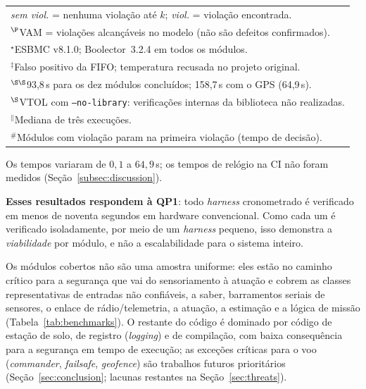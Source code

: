 \documentclass[conference]{IEEEtran}
\begin{document}
\begin{table}[t]
\begin{tabular}{@{}lcrccr@{}}
\bottomrule
\multicolumn{6}{l}{\textit{sem viol.} = nenhuma violação até $k$; \textit{viol.} = violação encontrada.}\\
\multicolumn{6}{l}{$^\P$VAM = violações alcançáveis no modelo (não são defeitos confirmados).}\\
\multicolumn{6}{l}{$^\star$ESBMC v8.1.0; Boolector~3.2.4 em todos os módulos.}\\
\multicolumn{6}{l}{$^\ddagger$Falso positivo da FIFO; temperatura recusada no projeto original.}\\
\multicolumn{6}{l}{$^{\S\S}$93,8\,s para os dez módulos concluídos; 158,7\,s com o GPS (64,9\,s).}\\
\multicolumn{6}{l}{$^\S$VTOL com \texttt{--no-library}: verificações internas da biblioteca não realizadas.}\\
\multicolumn{6}{l}{$^\|$Mediana de três execuções.}\\
\multicolumn{6}{l}{$^{\#}$Módulos com violação param na primeira violação (tempo de decisão).}
\end{tabular}
\end{table}
Os tempos variaram de $0{,}1$ a $64{,}9$\,s; os tempos de relógio na
CI não foram medidos (Seção~\ref{subsec:discussion}).
\begin{rqbox}
\textbf{Esses resultados respondem à QP1}: todo \textit{harness}
cronometrado é verificado em menos de noventa segundos em hardware
convencional. Como cada um é verificado isoladamente, por meio de um
\textit{harness} pequeno, isso demonstra a \emph{viabilidade} por
módulo, e não a escalabilidade para o sistema inteiro.
\end{rqbox}

Os módulos cobertos não são uma amostra uniforme: eles estão no
caminho crítico para a segurança que vai do sensoriamento à atuação e
cobrem as classes representativas de entradas não confiáveis, a
saber, barramentos seriais de sensores, o enlace de rádio/telemetria,
a atuação, a estimação e a lógica de missão
(Tabela~\ref{tab:benchmarks}).
O restante do código é dominado por código de estação de solo, de
registro (\textit{logging}) e de compilação, com baixa consequência
para a segurança em tempo de execução; as exceções críticas para o
voo (\textit{commander}, \textit{failsafe}, \textit{geofence}) são
trabalhos futuros prioritários (Seção~\ref{sec:conclusion}; lacunas
restantes na Seção~\ref{sec:threats}).
\end{document}
